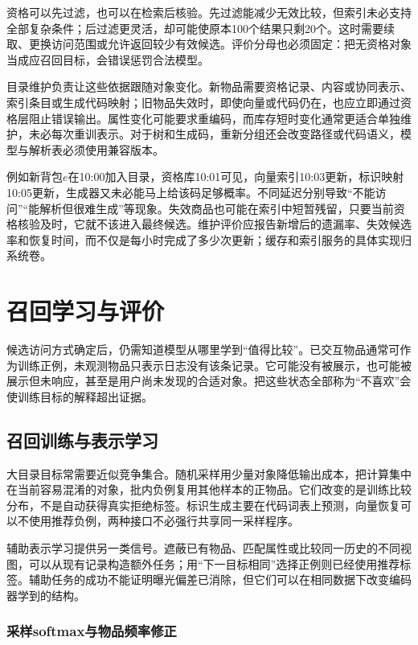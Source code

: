 资格可以先过滤，也可以在检索后核验。先过滤能减少无效比较，但索引未必支持全部复杂条件；后过滤更灵活，却可能使原本100个结果只剩20个。这时需要续取、更换访问范围或允许返回较少有效候选。评价分母也必须固定：把无资格对象当成应召回目标，会错误惩罚合法模型。

目录维护负责让这些依据跟随对象变化。新物品需要资格记录、内容或协同表示、索引条目或生成代码映射；旧物品失效时，即使向量或代码仍在，也应立即通过资格层阻止错误输出。属性变化可能要求重编码，而库存短时变化通常更适合单独维护，未必每次重训表示。对于树和生成码，重新分组还会改变路径或代码语义，模型与解析表必须使用兼容版本。

例如新背包$e$在10:00加入目录，资格库10:01可见，向量索引10:03更新，标识映射10:05更新，生成器又未必能马上给该码足够概率。不同延迟分别导致“不能访问”“能解析但很难生成”等现象。失效商品也可能在索引中短暂残留，只要当前资格核验及时，它就不该进入最终候选。维护评价应报告新增后的遗漏率、失效候选率和恢复时间，而不仅是每小时完成了多少次更新；缓存和索引服务的具体实现归系统卷。

\section{召回学习与评价}
\label{sec:rs-retrieval-learning}

候选访问方式确定后，仍需知道模型从哪里学到“值得比较”。已交互物品通常可作为训练正例，未观测物品只表示日志没有该条记录。它可能没有被展示，也可能被展示但未响应，甚至是用户尚未发现的合适对象。把这些状态全部称为“不喜欢”会使训练目标的解释超出证据。

\subsection{召回训练与表示学习}
\label{sec:rs-retrieval-training}

大目录目标常需要近似竞争集合。随机采样用少量对象降低输出成本，把计算集中在当前容易混淆的对象，批内负例复用其他样本的正物品。它们改变的是训练比较分布，不是自动获得真实拒绝标签。标识生成主要在代码词表上预测，向量恢复可以不使用推荐负例，两种接口不必强行共享同一采样程序。

辅助表示学习提供另一类信号。遮蔽已有物品、匹配属性或比较同一历史的不同视图，可以从现有记录构造额外任务；用“下一目标相同”选择正例则已经使用推荐标签。辅助任务的成功不能证明曝光偏差已消除，但它们可以在相同数据下改变编码器学到的结构。

\Needspace{125mm}
\subsubsection{采样softmax与物品频率修正}
\label{sec:rs-sampled-softmax}

